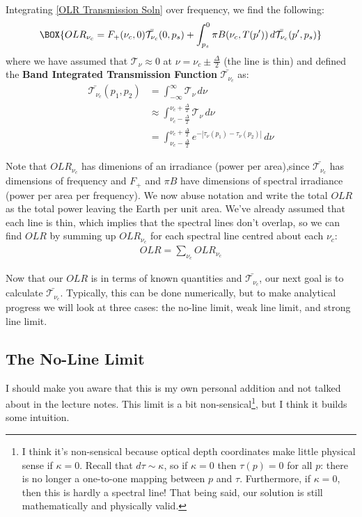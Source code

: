 Integrating \ref{OLR Transmission Soln} over frequency, we find the following:
\begin{align}
    \BOX{OLR_{\nu_c}
    =
    F_+(\nu_c,0)\bar{\mathcal{T}_{\nu_c}}(0,p_s)
    +
    \int_{p_s}^{0}\pi B(\nu_c,T(p'))\,d\bar{\mathcal{T}_{\nu_c}}(p',p_s)} \label{OLR Transmission Band Soln}
\end{align}
where we have assumed that $\mathcal{T}_{\nu}\approx 0$ at $\nu=\nu_c\pm\frac{\Delta}{2}$ (the line is thin) and defined the \textbf{Band Integrated Transmission Function} $\bar{\mathcal{T}_{\nu_c}}$ as:
\begin{align}\label{Transmission Function Band}
    \bar{\mathcal{T}_{\nu_c}}(p_1,p_2)&=\int_{-\infty}^{\infty}{\mathcal{T}_{\nu}}\,d\nu\\
    &\approx\int_{\nu_c-\frac{\Delta}{2}}^{\nu_c+\frac{\Delta}{2}}{\mathcal{T}_{\nu}}\,d\nu
    \\
    &=\int_{\nu_c-\frac{\Delta}{2}}^{\nu_c+\frac{\Delta}{2}} e^{-|\tau_\nu(p_1)-\tau_\nu(p_2)|}\,d\nu
\end{align}

\noindent Note that $OLR_{\nu_c}$ has dimenions of an irradiance (power per area),since $\bar{\mathcal{T}_{\nu_c}}$ has dimensions of frequency and $F_+$ and $\pi B$ have dimensions of spectral irradiance (power per area per frequency). We now abuse notation and write the total $OLR$ as the total power leaving the Earth per unit area. We've already assumed that each line is thin, which implies that the spectral lines don't overlap, so we can find $OLR$ by summing up $OLR_{\nu_c}$ for each spectral line centred about each $\nu_c$:
\begin{align*}
    OLR = \sum_{\nu_c} OLR_{\nu_c}
\end{align*}

Now that our $OLR$ is in terms of known quantities and $\bar{\mathcal{T}_{\nu_c}}$, our next goal is to calculate $\bar{\mathcal{T}_{\nu_c}}$. Typically, this can be done numerically, but to make analytical progress we will look at three cases: the no-line limit, weak line limit, and strong line limit.

\subsection{The No-Line Limit}
I should make you aware that this is my own personal addition and not talked about in the lecture notes. This limit is a bit non-sensical\footnote{
    I think it's non-sensical because optical depth coordinates make little physical sense if $\kappa=0$. Recall that $d\tau\sim \kappa$, so if $\kappa=0$ then $\tau(p)=0$ for all $p$: there is no longer a one-to-one mapping between $p$ and $\tau$. Furthermore, if $\kappa=0$, then this is hardly a spectral line! That being said, our solution is still mathematically and physically valid.
}, but I think it builds some intuition.

